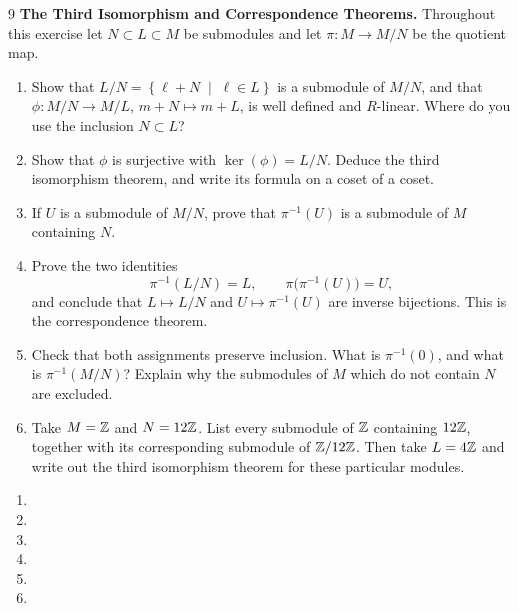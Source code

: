 \documentclass[Notebook.tex]{subfiles}
\begin{document}
\begin{problem}{9}\label{m:third}
	\textbf{The Third Isomorphism and Correspondence Theorems.} Throughout this exercise let $N\subset L\subset M$ be submodules and let $\pi:M\to M/N$ be the quotient map.
	\begin{enumerate}[label=(\alph*),ref=\theenumi\alph*]
		\item Show that $L/N=\left\{\ell+N \;\; \big| \;\; \ell\in L\right\}$ is a submodule of $M/N$, and that $\phi:M/N\to M/L$, $m+N\mapsto m+L$, is well defined and $R$-linear. Where do you use the inclusion $N\subset L$?
		\item Show that $\phi$ is surjective with $\ker(\phi)=L/N$. Deduce the third isomorphism theorem, and write its formula on a coset of a coset.
		\item If $U$ is a submodule of $M/N$, prove that $\pi^{-1}(U)$ is a submodule of $M$ containing $N$.
		\item Prove the two identities
		\[
		\pi^{-1}(L/N)=L,\qquad \pi\bigl(\pi^{-1}(U)\bigr)=U,
		\]
		and conclude that $L\mapsto L/N$ and $U\mapsto \pi^{-1}(U)$ are inverse bijections. This is the correspondence theorem.
		\item Check that both assignments preserve inclusion. What is $\pi^{-1}(0)$, and what is $\pi^{-1}(M/N)$? Explain why the submodules of $M$ which do not contain $N$ are excluded.
		\item Take $M=\mathbb Z$ and $N=12\mathbb Z$. List every submodule of $\mathbb Z$ containing $12\mathbb Z$, together with its corresponding submodule of $\mathbb Z/12\mathbb Z$. Then take $L=4\mathbb Z$ and write out the third isomorphism theorem for these particular modules.
	\end{enumerate}
\end{problem}

\begin{solution}
	\bbni
	\begin{enumerate}[label=(\alph*),ref=\theenumi\alph*]
		\item
		\item
		\item
		\item
		\item
		\item
	\end{enumerate}
\end{solution}

\newpage
\end{document}
